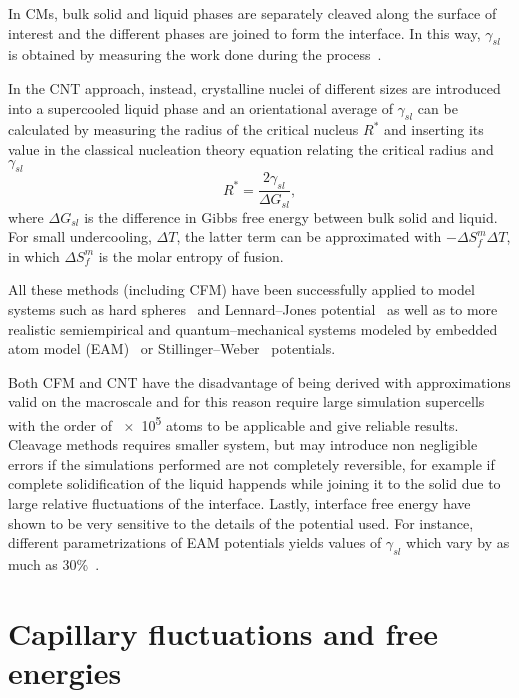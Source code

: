 In CMs, bulk solid and liquid phases are separately cleaved along the surface of interest and the different phases are joined to form the interface. In this way, $\gamma_{sl}$ is obtained by measuring the work done during the process~\cite{Broughton1986,Davidchack2000PRL}.

In the CNT approach, instead, crystalline nuclei of different sizes are introduced into a supercooled liquid phase and an orientational average of $\gamma_{sl}$ can be calculated by measuring the radius of the critical nucleus $R^*$ and inserting its value in the classical nucleation theory equation relating the critical radius and $\gamma_{sl}$
\begin{equation}
    R^*= \frac{2\gamma_{sl}}{\Delta G_{sl}},
\end{equation}
where $\Delta G_{sl}$ is the difference in Gibbs free energy between bulk solid and liquid. For small undercooling, $\Delta T$, the latter term can be approximated with $-\Delta S_f^m \Delta T$, in which $\Delta S_f^m$ is the molar entropy of fusion.

All these methods (including CFM) have been successfully applied to model systems such as hard spheres~\cite{Broughton1986,Davidchack2006} and Lennard--Jones potential~\cite{Bai2006xs:Angioletti6,Morris2003:Angioletti10} as well as to more realistic semiempirical and quantum--mechanical systems modeled by embedded atom model (EAM)~\cite{Bai2006xs:Angioletti6} or Stillinger--Weber~\cite{Altmann1965:Angioletti7} potentials.

Both CFM and CNT have the disadvantage of being derived with approximations valid on the macroscale and for this reason require large simulation supercells with the order of \num{e5} atoms to be applicable and give reliable results. Cleavage methods requires smaller system, but may introduce non negligible errors if the simulations performed are not completely reversible, for example if complete solidification of the liquid happends while joining it to the solid due to large relative fluctuations of the interface. Lastly, interface free energy have shown to be very sensitive to the details of the potential used. For instance, different parametrizations of EAM potentials yields values of $\gamma_{sl}$ which vary by as much as 30\%~\cite{Morris2007:Angioletti19}.









\section{Capillary fluctuations and free energies}%
\label{sec:CFM}


